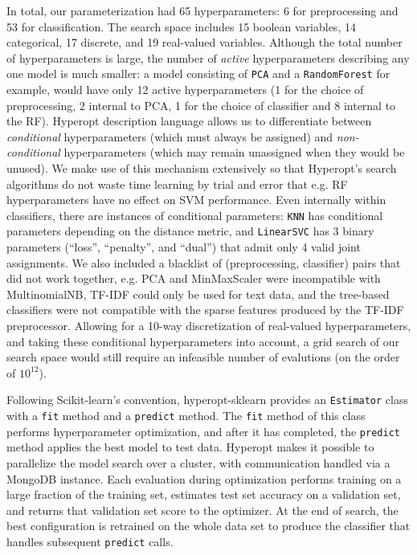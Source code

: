 \documentclass[wcp]{jmlr}
\begin{document}
In total, our parameterization had 65 hyperparameters: 6 for preprocessing and 53 for classification.
The search space includes 15 boolean variables, 14 categorical, 17 discrete, and 19 real-valued variables.
Although the total number of hyperparameters is large, the number of {\em active} hyperparameters describing any one model is much smaller: a model consisting of \texttt{PCA} and a \texttt{RandomForest} for example,
would have only 12 active hyperparameters (1 for the choice of preprocessing, 2 internal to PCA, 1 for the choice of classifier and 8 internal to the RF).
Hyperopt description language allows us to differentiate between {\em conditional} hyperparameters (which must always be assigned) and {\em non-conditional} hyperparameters (which may remain unassigned when they would be unused).
We make use of this mechanism extensively so that Hyperopt's search algorithms do not waste time learning by trial and error that e.g. RF hyperparameters have no effect on SVM performance.
Even internally within classifiers, there are instances of conditional parameters: \texttt{KNN} has conditional parameters depending on the distance metric,
and \texttt{LinearSVC} has 3 binary parameters (``loss'', ``penalty'', and ``dual'') that admit only 4 valid joint assignments.
We also included a blacklist of (preprocessing, classifier) pairs that did not work together, e.g. PCA and MinMaxScaler were incompatible with MultinomialNB, TF-IDF could only be used for text data, and the tree-based classifiers were not
compatible with the sparse features produced by the TF-IDF preprocessor.
Allowing for a 10-way discretization of real-valued hyperparameters, and taking these conditional hyperparameters into account, a grid search of our search space would still require an infeasible number of evalutions (on the order of $10^{12}$).

Following Scikit-learn's convention, hyperopt-sklearn provides an \texttt{Estimator} class with a \texttt{fit} method and a \texttt{predict} method.
The \texttt{fit} method of this class performs hyperparameter optimization, and after it has completed, the \texttt{predict} method applies the best model to test data.
Hyperopt makes it possible to parallelize the model search over a cluster, with communication handled via a MongoDB instance.
Each evaluation during optimization performs training on a large fraction of the training set, estimates test set accuracy on a validation set, and returns that validation set score to the optimizer.
At the end of search, the best configuration is retrained on the whole data set to produce the classifier that handles subsequent \texttt{predict} calls.
\end{document}
